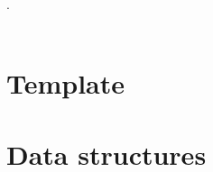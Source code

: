 

\def\title{UACJ - Everyone's Connected}
.\\[0.2cm]
 \\[0.5cm]
\tableofcontents\newpage

\section{Template}
\section{Data structures}
